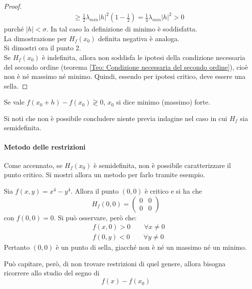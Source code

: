\begin{proof}
\begin{equation*}
\begin{aligned}
            &\geq \frac{1}{2}\lambda_{min}|h|^2\left(1-\frac{1}{2}\right)=\frac{1}{4}\lambda_{min}|h|^2 >0
            \end{aligned}
        \end{equation*}
        purché $|h|< \sigma$. In tal caso la definizione di minimo è soddisfatta.\\
        La dimostrazione per $H_f(x_0)$ definita negativa è analoga.\\
    Si dimostri ora il punto 2.\\
    Se $H_f(x_0)$ è indefinita, allora non soddisfa le ipotesi della condizione necessaria del secondo ordine (teorema \ref{Teo: Condizione necessaria del secondo ordine}), cioè non è né massimo né minimo. Quindi, essendo per ipotesi critico, deve essere una sella.
    \end{proof}
    \begin{oss}
        Se vale $f(x_0+h)-f(x_0) \gtrless 0$, $x_0$ si dice minimo (massimo) forte.
    \end{oss}
    \begin{oss}
        Si noti che non è possibile concludere niente previa indagine nel caso in cui $H_f$ sia semidefinita.
    \end{oss}
    \paragraph{Metodo delle restrizioni} Come accennato, se $H_f(x_0)$ è semidefinita, non è possibile caratterizzare il punto critico. Si mostri allora un metodo per farlo tramite esempio.
    \begin{example}
        Sia $f(x,y)=x^4-y^4$. Allora il punto $(0,0)$ è critico e si ha che
        \begin{equation*}
            H_f(0,0)=\begin{pmatrix}
                0 & 0\\
                0 & 0
            \end{pmatrix}
        \end{equation*}
        con $f(0,0)=0$. Si può osservare, però che:
        \begin{equation*}
            \begin{aligned}
                &f(x, 0) > 0 \qquad \forall x \neq 0\\
                &f(0,y) < 0 \qquad \forall y \neq 0
            \end{aligned}
        \end{equation*}
        Pertanto $(0,0)$ è un punto di sella, giacché non è né un massimo né un minimo.
    \end{example}
    Può capitare, però, di non trovare restrizioni di quel genere, allora bisogna ricorrere allo studio del segno di
    \begin{equation*}
        f(x)-f(x_0)
    \end{equation*}
